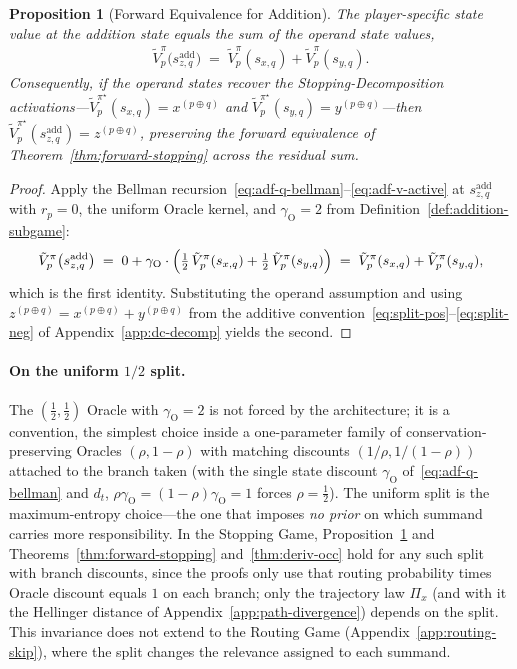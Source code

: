 \documentclass[twoside]{article}
\newcommand{\1}{\mathbf{1}}
\newtheorem{proposition}{Proposition}
\begin{document}
\begin{proposition}[Forward Equivalence for Addition]\label{prop:addition-equivalence}
The player-specific state value at the addition state equals the sum of the operand state values,
\begin{align}
    \tilde V_p^{\pi}\bigl(s_{z,q}^{\mathrm{add}}\bigr)
    \;=\;
    \tilde V_p^{\pi}(s_{x,q}) + \tilde V_p^{\pi}(s_{y,q}).
\end{align}
Consequently, if the operand states recover the Stopping-Decomposition activations---$\tilde
    V_p^{\pi^\star}(s_{x,q}) = x^{(p\oplus q)}$ and $\tilde V_p^{\pi^\star}(s_{y,q}) = y^{(p\oplus
    q)}$---then $\tilde V_p^{\pi^\star}(s_{z,q}^{\mathrm{add}}) = z^{(p\oplus q)}$, preserving the
forward equivalence of Theorem~\ref{thm:forward-stopping} across the residual sum.
\end{proposition}

\begin{proof}
Apply the Bellman recursion~\eqref{eq:adf-q-bellman}--\eqref{eq:adf-v-active} at
$s_{z,q}^{\mathrm{add}}$ with $r_p = 0$, the uniform Oracle kernel, and $\gamma_{\mathrm{O}} = 2$
from Definition~\ref{def:addition-subgame}:
\begin{align}
    \tilde V_p^{\pi}\bigl(s_{z,q}^{\mathrm{add}}\bigr)
    \;=\; 0 + \gamma_{\mathrm{O}} \cdot \Bigl(\tfrac{1}{2}\,\tilde V_p^{\pi}(s_{x,q}) +
    \tfrac{1}{2}\,\tilde V_p^{\pi}(s_{y,q})\Bigr)
    \;=\; \tilde V_p^{\pi}(s_{x,q}) + \tilde V_p^{\pi}(s_{y,q}),
\end{align}
which is the first identity. Substituting the operand assumption and using $z^{(p\oplus q)} =
    x^{(p\oplus q)} + y^{(p\oplus q)}$ from the additive
convention~\eqref{eq:split-pos}--\eqref{eq:split-neg} of Appendix~\ref{app:dc-decomp} yields the
second.
\end{proof}

\paragraph{On the uniform $1/2$ split.}
The $(\tfrac{1}{2}, \tfrac{1}{2})$ Oracle with $\gamma_{\mathrm{O}} = 2$ is not forced by the
architecture; it is a convention, the simplest choice inside a one-parameter family of
conservation-preserving Oracles $(\rho, 1-\rho)$ with matching discounts $(1/\rho, 1/(1-\rho))$
attached to the branch taken (with the single state discount $\gamma_{\mathrm{O}}$
of~\eqref{eq:adf-q-bellman} and $d_t$, $\rho\gamma_{\mathrm{O}}=(1-\rho)\gamma_{\mathrm{O}}=1$
forces $\rho=\tfrac12$). The uniform split is the maximum-entropy choice---the one that imposes
\emph{no prior} on which summand carries more responsibility. In the Stopping Game,
Proposition~\ref{prop:addition-equivalence} and Theorems~\ref{thm:forward-stopping}
and~\ref{thm:deriv-occ} hold for any such split with branch discounts, since the proofs only use
that routing probability times Oracle discount equals $1$ on each branch; only the trajectory law
$\Pi_x$ (and with it the Hellinger distance of Appendix~\ref{app:path-divergence}) depends on the
split. This invariance does not extend to the Routing Game (Appendix~\ref{app:routing-skip}), where
the split changes the relevance assigned to each summand.
\end{document}
